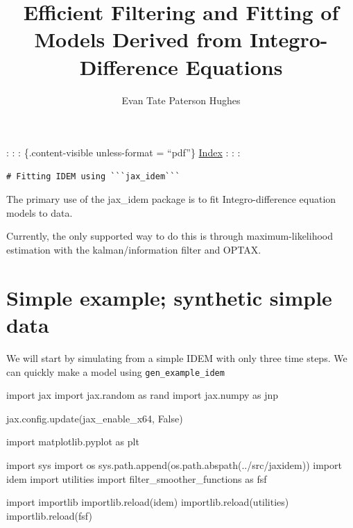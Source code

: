 \documentclass[
]{report}
\title{Efficient Filtering and Fitting of Models Derived from
Integro-Difference Equations}
\author{Evan Tate Paterson Hughes}
\date{}
\newenvironment{Shaded}{\begin{snugshade}}{\end{snugshade}}
\newcommand{\BuiltInTok}[1]{\textcolor[rgb]{0.00,0.23,0.31}{#1}}
\newcommand{\ImportTok}[1]{\textcolor[rgb]{0.00,0.46,0.62}{#1}}
\newcommand{\NormalTok}[1]{\textcolor[rgb]{0.00,0.23,0.31}{#1}}
\newcommand{\StringTok}[1]{\textcolor[rgb]{0.13,0.47,0.30}{#1}}
\newcommand{\VariableTok}[1]{\textcolor[rgb]{0.07,0.07,0.07}{#1}}
\renewcommand*\contentsname{Table of contents}
\newcommand\contentsname{Table of contents}
\begin{document}
\maketitle

\renewcommand*\contentsname{Table of contents}
{
\hypersetup{linkcolor=}
\setcounter{tocdepth}{2}
\tableofcontents
}

: : : \{.content-visible unless-format = ``pdf''\}
\href{../index.html}{Index} : : :

\begin{verbatim}
# Fitting IDEM using ```jax_idem```
\end{verbatim}

The primary use of the jax\_idem package is to fit Integro-difference
equation models to data.

Currently, the only supported way to do this is through
maximum-likelihood estimation with the kalman/information filter and
OPTAX.

\chapter{Simple example; synthetic simple
data}\label{simple-example-synthetic-simple-data}

We will start by simulating from a simple IDEM with only three time
steps. We can quickly make a model using \texttt{gen\_example\_idem}

\begin{Shaded}
\begin{Highlighting}[]
\ImportTok{import}\NormalTok{ jax}
\ImportTok{import}\NormalTok{ jax.random }\ImportTok{as}\NormalTok{ rand}
\ImportTok{import}\NormalTok{ jax.numpy }\ImportTok{as}\NormalTok{ jnp}

\NormalTok{jax.config.update(}\StringTok{\textquotesingle{}jax\_enable\_x64\textquotesingle{}}\NormalTok{, }\VariableTok{False}\NormalTok{)}

\ImportTok{import}\NormalTok{ matplotlib.pyplot }\ImportTok{as}\NormalTok{ plt}

\ImportTok{import}\NormalTok{ sys}
\ImportTok{import}\NormalTok{ os}
\NormalTok{sys.path.append(os.path.abspath(}\StringTok{\textquotesingle{}../src/jaxidem\textquotesingle{}}\NormalTok{))}
\ImportTok{import}\NormalTok{ idem}
\ImportTok{import}\NormalTok{ utilities}
\ImportTok{import}\NormalTok{ filter\_smoother\_functions }\ImportTok{as}\NormalTok{ fsf}

\ImportTok{import}\NormalTok{ importlib}
\NormalTok{importlib.}\BuiltInTok{reload}\NormalTok{(idem)}
\NormalTok{importlib.}\BuiltInTok{reload}\NormalTok{(utilities)}
\NormalTok{importlib.}\BuiltInTok{reload}\NormalTok{(fsf)}
\end{Highlighting}
\end{Shaded}
\end{document}
